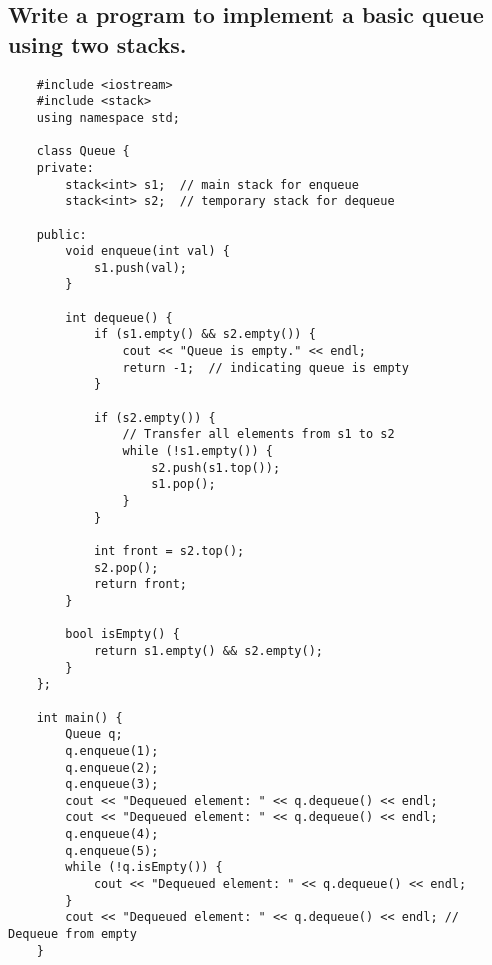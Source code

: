\subsection{Write a program to implement a basic queue using two stacks.}
\begin{tcolorbox}[title=]
\begin{verbatim}
    #include <iostream>
    #include <stack>
    using namespace std;
    
    class Queue {
    private:
        stack<int> s1;  // main stack for enqueue
        stack<int> s2;  // temporary stack for dequeue
    
    public:
        void enqueue(int val) {
            s1.push(val);
        }
    
        int dequeue() {
            if (s1.empty() && s2.empty()) {
                cout << "Queue is empty." << endl;
                return -1;  // indicating queue is empty
            }
    
            if (s2.empty()) {
                // Transfer all elements from s1 to s2
                while (!s1.empty()) {
                    s2.push(s1.top());
                    s1.pop();
                }
            }
    
            int front = s2.top();
            s2.pop();
            return front;
        }
    
        bool isEmpty() {
            return s1.empty() && s2.empty();
        }
    };
    
    int main() {
        Queue q;
        q.enqueue(1);
        q.enqueue(2);
        q.enqueue(3);
        cout << "Dequeued element: " << q.dequeue() << endl;
        cout << "Dequeued element: " << q.dequeue() << endl;
        q.enqueue(4);
        q.enqueue(5);
        while (!q.isEmpty()) {
            cout << "Dequeued element: " << q.dequeue() << endl;
        }
        cout << "Dequeued element: " << q.dequeue() << endl; // Dequeue from empty
    }
\end{verbatim}
\end{tcolorbox}
